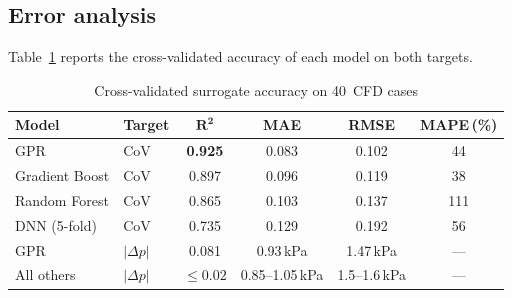 \documentclass[11pt,a4paper]{article}
\def\CoV{CoV}%
\newcommand{\CoV}{\ensuremath{\mathrm{CoV}}}
\begin{document}
\subsection{Error analysis}
Table~\ref{tab:surrogate_error} reports the cross-validated
accuracy of each model on both targets.

\begin{table}[H]
\centering
\caption{Cross-validated surrogate accuracy on 40~CFD cases}
\label{tab:surrogate_error}
\begin{tabular}{@{}llcccc@{}}
\toprule
\textbf{Model} & \textbf{Target} & \(\bm{R^{2}}\) & \textbf{MAE}
  & \textbf{RMSE} & \textbf{MAPE\,(\%)} \\ \midrule
GPR            & \CoV{}          & \textbf{0.925}  & 0.083 & 0.102 & 44 \\
Gradient Boost & \CoV{}          & 0.897           & 0.096 & 0.119 & 38 \\
Random Forest  & \CoV{}          & 0.865           & 0.103 & 0.137 & 111 \\
DNN (5-fold)   & \CoV{}          & 0.735           & 0.129 & 0.192 & 56 \\ \midrule
GPR            & \(|\Delta p|\)  & 0.081           & 0.93\,kPa & 1.47\,kPa & --- \\
All others     & \(|\Delta p|\)  & \(\le 0.02\)    & 0.85--1.05\,kPa & 1.5--1.6\,kPa & --- \\
\bottomrule
\end{tabular}
\end{table}
\end{document}
